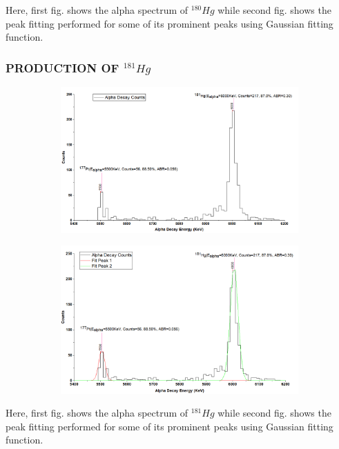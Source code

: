 \documentclass[12pt]{article}
\begin{document}
Here, first fig. shows the alpha spectrum of $^{180}Hg$ while second fig. shows the peak fitting performed for some of its prominent peaks using Gaussian fitting function.
\clearpage

\subsubsection{PRODUCTION OF $^{181}Hg$}
\begin{figure}[h]
\centering
\begin{subfigure}
\centering
\includegraphics[scale=0.5]{Hg181.png}
\end{subfigure}
\hfill
\begin{subfigure}
\centering
\includegraphics[scale=0.5]{Hg181(Peak Fitting).png}
\end{subfigure}
\label{First fig shows the alpha spectrum of Hg 181 and second fig shows the peak fitting for its prominent peaks.}
\end{figure}
Here, first fig. shows the alpha spectrum of $^{181}Hg$ while second fig. shows the peak fitting performed for some of its prominent peaks using Gaussian fitting function.
\clearpage
\end{document}
